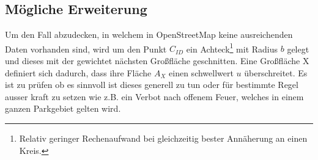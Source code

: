 \subsection{Mögliche Erweiterung}
Um den Fall abzudecken, in welchem in OpenStreetMap keine ausreichenden Daten vorhanden sind, wird um den Punkt $C_{ID}$ ein
Achteck\footnote{Relativ geringer Rechenaufwand bei gleichzeitig bester Annäherung an einen Kreis.} mit Radius $b$ gelegt
und dieses mit der gewichtet nächsten Großfläche geschnitten.
Eine Großfläche X definiert sich dadurch, dass ihre Fläche $A_X$ einen schwellwert $u$ überschreitet.
Es ist zu prüfen ob es sinnvoll ist dieses generell zu tun oder für bestimmte Regel ausser kraft zu setzen wie
z.B. ein Verbot nach offenem Feuer, welches in einem ganzen Parkgebiet gelten wird.
